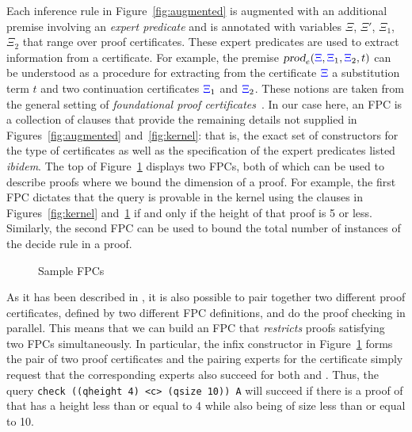 Each inference rule in Figure~\ref{fig:augmented} is augmented with an
additional premise involving an \emph{expert predicate} and is
annotated with variables $\Xi$, $\Xi'$, $\Xi_1$, $\Xi_2$ that range
over proof certificates.  These expert predicates are used to extract
information from a certificate.  For example, the premise
$\hbox{\sl prod}_e({\color{blue}{\Xi}},{\color{blue}{\Xi}}_1,{\color{blue}{\Xi}}_2,t)$ can be understood as a procedure for
extracting from the certificate ${\color{blue}{\Xi}}$ a substitution term $t$ and two
continuation certificates ${\color{blue}{\Xi}}_1$ and ${\color{blue}{\Xi}}_2$.
%
These notions are taken from the general setting of \emph{foundational
  proof certificates}~\cite{chihani17jar}.
%
In our case here, an FPC is a collection of \lP clauses that provide
the remaining details not supplied in Figures~\ref{fig:augmented}
and~\ref{fig:kernel}: that is, the exact set of constructors for the
type of certificates  as well as the specification of the expert
predicates listed \emph{ibidem}.
%
The top of Figure~\ref{fig:resources} displays two FPCs,
both of which can be used to describe proofs where we bound
the dimension of  a proof.
%
For example, the first FPC dictates that the query \mbox{} is
provable in  the kernel using the clauses in Figures~\ref{fig:kernel}
and~\ref{fig:resources} if and only if the height of that proof is 5
or less.
%
Similarly, the second FPC can be used to bound the total number of
instances of the decide rule in a proof.
%

\begin{figure}[t]


\caption{Sample FPCs}
\label{fig:resources}
\end{figure}

As it has been described in \cite{blanco17cade}, it is also possible
to pair together two different proof certificates, defined by two
different FPC definitions, and do the proof checking in parallel.
This means that we can build an FPC that \emph{restricts} proofs
satisfying two FPCs simultaneously.  In particular, the infix
constructor  in Figure~\ref{fig:resources} forms the pair of
two proof certificates and the pairing experts for the certificate
 simply request that the corresponding experts
also succeed for both  and . Thus, the query
\verb+check ((qheight 4) <c> (qsize 10)) A+ will succeed if there is a
proof of  that has a height less than or equal to 4 while also
being of size less than or equal to 10.

